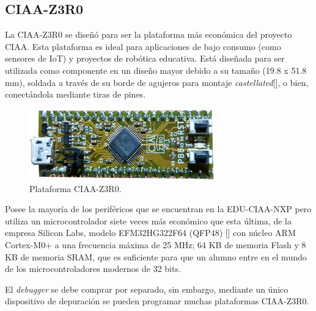 
\subsection{CIAA-Z3R0}
\label{sec:CIAA-Z3R0}

La CIAA-Z3R0 se diseñó para ser la plataforma más económica del proyecto CIAA. Esta plataforma es ideal para aplicaciones de bajo consumo (como sensores de IoT) y proyectos de robótica educativa. Está diseñada para ser utilizada como componente en un diseño mayor debido a su tamaño (19.8 x 51.8 mm), soldada a través de su borde de agujeros para montaje \emph{castellated}[], o bien, conectándola mediante tiras de pines.

\begin{figure}[!htbp]
\begin{center}  %
\includegraphics*[width=8cm]{Figures/CIAA-Z3R0_Foto.png}
\par\caption{Plataforma CIAA-Z3R0.}\label{fig:ciaaZero}
\end{center}
\end{figure}

Posee la mayoría de los periféricos que se encuentran en la EDU-CIAA-NXP pero utiliza un microcontrolador siete veces más económico que esta última, de la empresa Silicon Labs, modelo EFM32HG322F64 (QFP48) [] con núcleo ARM Cortex-M0+ a una frecuencia máxima de 25 MHz; 64 KB de memoria Flash y 8 KB de memoria SRAM, que es suficiente para que un alumno entre en el mundo de los microcontroladores modernos de 32 bits.

El \emph{debugger} se debe comprar por separado, sin embargo, mediante un único dispositivo de depuración se pueden programar muchas plataformas CIAA-Z3R0.


